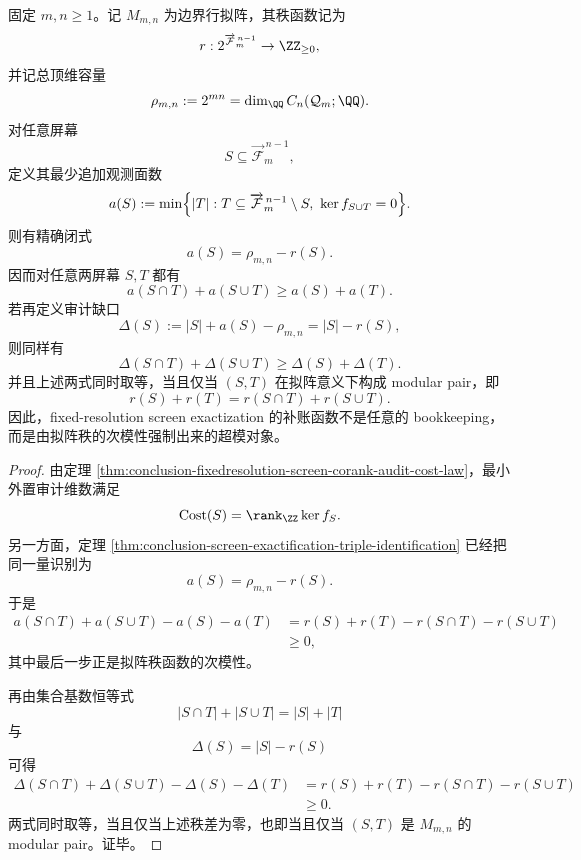 \begin{theorem}[审计补账函数的拟阵超模刚性]\label{thm:conclusion-fixedresolution-screen-audit-gap-supermodularity}
固定 \(m,n\ge 1\)。记 \(M_{m,n}\) 为边界行拟阵，其秩函数记为
\[
r:2^{\overrightarrow{\mathcal F}^{\,n-1}_m}\to \ZZ_{\ge 0},
\]
并记总顶维容量
\[
\rho_{m,n}:=2^{mn}=\dim_{\QQ}C_n(\mathcal Q_m;\QQ).
\]
对任意屏幕
\[
S\subseteq \overrightarrow{\mathcal F}^{\,n-1}_m,
\]
定义其最少追加观测面数
\[
a(S):=
\min\Bigl\{
|T|:
T\subseteq \overrightarrow{\mathcal F}^{\,n-1}_m\setminus S,\
\ker f_{S\cup T}=0
\Bigr\}.
\]
则有精确闭式
\[
a(S)=\rho_{m,n}-r(S).
\]
因而对任意两屏幕 \(S,T\) 都有
\[
a(S\cap T)+a(S\cup T)\ge a(S)+a(T).
\]
若再定义审计缺口
\[
\Delta(S):=|S|+a(S)-\rho_{m,n}=|S|-r(S),
\]
则同样有
\[
\Delta(S\cap T)+\Delta(S\cup T)\ge \Delta(S)+\Delta(T).
\]
并且上述两式同时取等，当且仅当 \((S,T)\) 在拟阵意义下构成 modular pair，即
\[
r(S)+r(T)=r(S\cap T)+r(S\cup T).
\]
因此，fixed-resolution screen exactization 的补账函数不是任意的 bookkeeping，而是由拟阵秩的次模性强制出来的超模对象。
\end{theorem}

\begin{proof}
由定理 \ref{thm:conclusion-fixedresolution-screen-corank-audit-cost-law}，最小外置审计维数满足
\[
\operatorname{Cost}(S)=\rank_\ZZ\ker f_S.
\]
另一方面，定理 \ref{thm:conclusion-screen-exactification-triple-identification} 已经把同一量识别为
\[
a(S)=\rho_{m,n}-r(S).
\]
于是
\[
\begin{aligned}
a(S\cap T)+a(S\cup T)-a(S)-a(T)
&=
r(S)+r(T)-r(S\cap T)-r(S\cup T) \\
&\ge 0,
\end{aligned}
\]
其中最后一步正是拟阵秩函数的次模性。

再由集合基数恒等式
\[
|S\cap T|+|S\cup T|=|S|+|T|
\]
与
\[
\Delta(S)=|S|-r(S)
\]
可得
\[
\begin{aligned}
\Delta(S\cap T)+\Delta(S\cup T)-\Delta(S)-\Delta(T)
&=
r(S)+r(T)-r(S\cap T)-r(S\cup T) \\
&\ge 0.
\end{aligned}
\]
两式同时取等，当且仅当上述秩差为零，也即当且仅当 \((S,T)\) 是 \(M_{m,n}\) 的 modular pair。证毕。
\end{proof}

